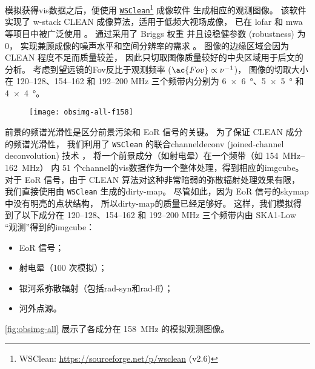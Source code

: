 模拟获得\ac{vis}数据之后，便使用
\href{https://sourceforge.net/p/wsclean}{\texttt{WSClean}}\footnote{%
  WSClean: \url{https://sourceforge.net/p/wsclean} (v2.6)}
成像软件\cite{offringa2014}
生成相应的观测图像。
该软件实现了 \ac{w-stack} CLEAN 成像算法，适用于低频大视场成像，
已在 \ac{lofar} 和 \ac{mwa} 等项目中被广泛使用 \cite{offringa2014,offringa2017}。
通过采用了 Briggs 权重\cite{briggs1995}
并且设稳健参数 (robustness) 为 0，
实现兼顾成像的噪声水平和空间分辨率的需求 \cite{briggs1995}。
图像的边缘区域会因为 CLEAN 程度不足而质量较差，
因此只切取图像质量较好的中央区域用于后文的分析。
考虑到望远镜的\acl{Fov}反比于观测频率 ($\ac{Fov} \propto \nu^{-1}$)，
图像的切取大小在 \numrange{120}{128}、\numrange{154}{162} 和
\numrange{192}{200} \si{\MHz} 三个频带内分别为
\SI{6 x 6}{\degree}、\SI{5 x 5}{\degree} 和 \SI{4 x 4}{\degree}。

\begin{figure}[htp]
  \centering
  \texttt{[image: obsimg-all-f158]}
  \label{fig:obsimg-all}
\end{figure}

前景的频谱光滑性是区分前景污染和 EoR 信号的关键。
为了保证 CLEAN 成分的频谱光滑性，
我们利用了 \texttt{WSClean} 的联合\ac{channel}\ac{deconv}
(joined-channel deconvolution) 技术 \cite{offringa2017}，
将一个前景成分（如射电晕）在一个频带（如 \SIrange{154}{162}{\MHz}）
内 51 个\ac{channel}的\ac{vis}数据作为一个整体处理，得到相应的\ac{imgcube}。
对于 EoR 信号，由于 CLEAN 算法对这种非常暗弱的弥散辐射处理效果有限，
我们直接使用由 \texttt{WSClean} 生成的\ac{dirty-map}。
尽管如此，因为 EoR 信号的\ac{skymap}中没有明亮的点状结构，
所以\ac{dirty-map}的质量已经足够好。
这样，我们模拟得到了以下成分在 \numrange{120}{128}、\numrange{154}{162}
和 \numrange{192}{200} \si{\MHz} 三个频带内由
SKA1-Low \enquote{观测}得到的\ac{imgcube}：
\begin{itemize}
  \item EoR 信号；
  \item 射电晕（100 次模拟）；
  \item 银河系弥散辐射（包括\ac{rad-syn}和\ac{rad-ff}）；
  \item 河外点源。
\end{itemize}
\autoref{fig:obsimg-all} 展示了各成分在 \SI{158}{\MHz} 的模拟观测图像。



